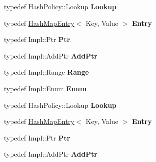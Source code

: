 \begin{DoxyCompactItemize}
\item 
\hypertarget{classjs_1_1_hash_map_ad2ad2333aa9edd517b8b7ffdc13b4a6a}{typedef Hash\-Policy\-::\-Lookup {\bfseries Lookup}}\label{classjs_1_1_hash_map_ad2ad2333aa9edd517b8b7ffdc13b4a6a}

\item 
\hypertarget{classjs_1_1_hash_map_a5804004c3093e5799da06bea356cdc9f}{typedef \hyperlink{classjs_1_1_hash_map_entry}{Hash\-Map\-Entry}$<$ Key, Value $>$ {\bfseries Entry}}\label{classjs_1_1_hash_map_a5804004c3093e5799da06bea356cdc9f}

\item 
\hypertarget{classjs_1_1_hash_map_aa6f8900e877c3edab756b0237ed1ea49}{typedef Impl\-::\-Ptr {\bfseries Ptr}}\label{classjs_1_1_hash_map_aa6f8900e877c3edab756b0237ed1ea49}

\item 
\hypertarget{classjs_1_1_hash_map_ae2ccac727e2bf20384132cea6c8934f8}{typedef Impl\-::\-Add\-Ptr {\bfseries Add\-Ptr}}\label{classjs_1_1_hash_map_ae2ccac727e2bf20384132cea6c8934f8}

\item 
\hypertarget{classjs_1_1_hash_map_ab46363f19526ec43155369132bd0a010}{typedef Impl\-::\-Range {\bfseries Range}}\label{classjs_1_1_hash_map_ab46363f19526ec43155369132bd0a010}

\item 
\hypertarget{classjs_1_1_hash_map_ad819d1c1f0dc803f44f6ee6d8046e6ba}{typedef Impl\-::\-Enum {\bfseries Enum}}\label{classjs_1_1_hash_map_ad819d1c1f0dc803f44f6ee6d8046e6ba}

\item 
\hypertarget{classjs_1_1_hash_map_ad2ad2333aa9edd517b8b7ffdc13b4a6a}{typedef Hash\-Policy\-::\-Lookup {\bfseries Lookup}}\label{classjs_1_1_hash_map_ad2ad2333aa9edd517b8b7ffdc13b4a6a}

\item 
\hypertarget{classjs_1_1_hash_map_a5804004c3093e5799da06bea356cdc9f}{typedef \hyperlink{classjs_1_1_hash_map_entry}{Hash\-Map\-Entry}$<$ Key, Value $>$ {\bfseries Entry}}\label{classjs_1_1_hash_map_a5804004c3093e5799da06bea356cdc9f}

\item 
\hypertarget{classjs_1_1_hash_map_aa6f8900e877c3edab756b0237ed1ea49}{typedef Impl\-::\-Ptr {\bfseries Ptr}}\label{classjs_1_1_hash_map_aa6f8900e877c3edab756b0237ed1ea49}

\item 
\hypertarget{classjs_1_1_hash_map_ae2ccac727e2bf20384132cea6c8934f8}{typedef Impl\-::\-Add\-Ptr {\bfseries Add\-Ptr}}\label{classjs_1_1_hash_map_ae2ccac727e2bf20384132cea6c8934f8}


\end{DoxyCompactItemize}
